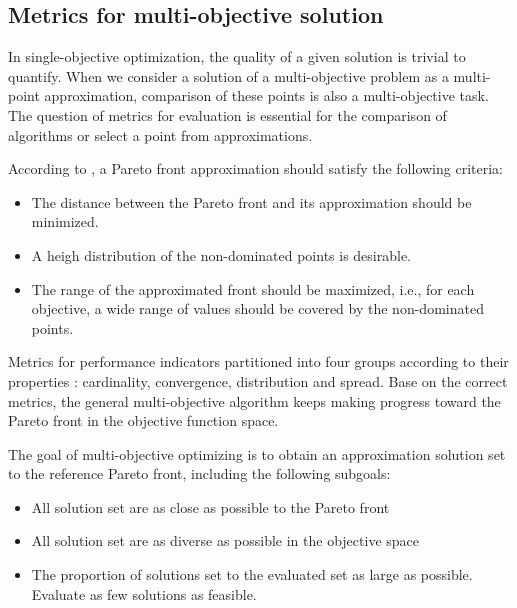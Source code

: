         \subsection{Metrics for multi-objective solution}
            In single-objective optimization, the quality of a given solution is trivial to quantify. When we consider a solution of a multi-objective problem as a multi-point approximation, comparison of these points is also a multi-objective task.
            The question of metrics for evaluation is essential for the comparison of algorithms or select a point from approximations.

            According to \cite{ZitzlerDT00}, a Pareto front approximation should satisfy the following criteria:
            \begin{itemize}
                \item The distance between the Pareto front and its approximation should be minimized.
                \item A heigh distribution of the non-dominated points is desirable.
                \item The range of the approximated front should be maximized, i.e., for each objective, a wide range of values should be covered by the non-dominated points.
            \end{itemize}

            Metrics for performance indicators partitioned into four groups according to their properties \cite{Audet2018PerformanceII}: cardinality, convergence, distribution and spread. Base on the correct metrics, the general multi-objective algorithm keeps making progress toward the Pareto front in the objective function space.

            The goal of multi-objective optimizing is to obtain an approximation solution set to the reference Pareto front, including the following subgoals:
            \begin{itemize}
                \item All solution set are as close as possible to the Pareto front
                \item All solution set are as diverse as possible in the objective space
                \item The proportion of solutions set to the evaluated set as large as possible. Evaluate as few solutions as feasible.
            \end{itemize}

